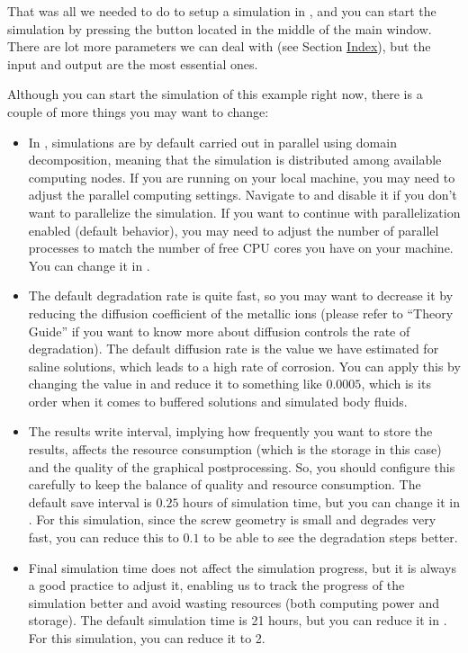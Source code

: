 That was all we needed to do to setup a simulation in \biodeg{}, and you can start the simulation by pressing the  button located in the middle of the main window. There are lot more parameters we can deal with (see Section \hyperref[sec:index]{Index}), but the input and output are the most essential ones. 

Although you can start the simulation of this example right now, there is a couple of more things you may want to change:

\begin{itemize}
\item
In \biodeg{}, simulations are by default carried out in parallel using domain decomposition, meaning that the simulation is distributed among available computing nodes. If you are running \biodeg{} on your local machine, you may need to adjust the parallel computing settings. Navigate to  and disable it if you don't want to parallelize the simulation. If you want to continue with parallelization enabled (default behavior), you may need to adjust the number of parallel processes to match the number of free CPU cores you have on your machine. You can change it in . 
\item
The default degradation rate is quite fast, so you may want to decrease it by reducing the diffusion coefficient of the metallic ions (please refer to ``Theory Guide'' if you want to know more about diffusion controls the rate of degradation). The default diffusion rate is the value we have estimated for saline solutions, which leads to a high rate of corrosion. You can apply this by changing the value in  and reduce it to something like $0.0005$, which is its order when it comes to buffered solutions and simulated body fluids.
\item
The results write interval, implying how frequently you want to store the results, affects the resource consumption (which is the storage in this case) and the quality of the graphical postprocessing. So, you should configure this carefully to keep the balance of quality and resource consumption. The default save interval is $0.25$ hours of simulation time, but you can change it in . For this simulation, since the screw geometry is small and degrades very fast, you can reduce this to $0.1$ to be able to see the degradation steps better.
\item
Final simulation time does not affect the simulation progress, but it is always a good practice to adjust it, enabling us to track the progress of the simulation better and avoid wasting resources (both computing power and storage). The default simulation time is 21 hours, but you can reduce it in . For this simulation, you can reduce it to 2.
\end{itemize}

